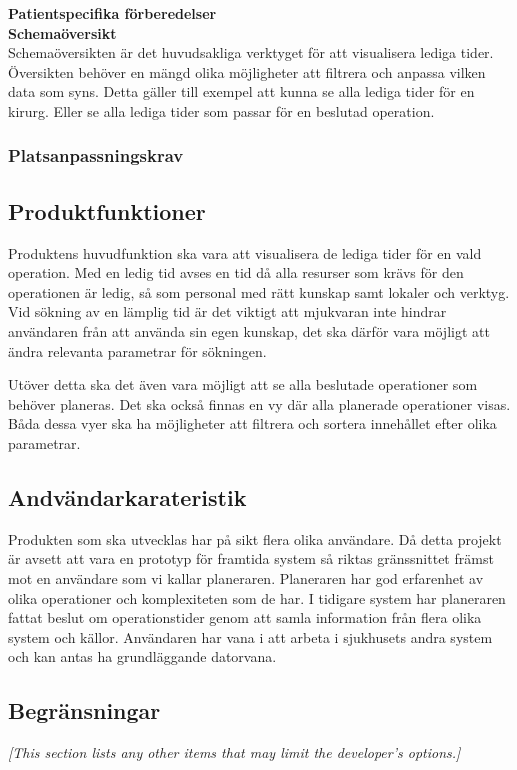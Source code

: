 \documentclass{article}
\begin{document}
\begin{enumerate}
\textbf{Patientspecifika förberedelser}\\
\textbf{Schemaöversikt}\\
Schemaöversikten är det huvudsakliga verktyget för att visualisera lediga tider.
Översikten behöver en mängd olika möjligheter att filtrera och anpassa vilken
data som syns. Detta gäller till exempel att kunna se alla lediga tider för en
kirurg. Eller se alla lediga tider som passar för en beslutad operation.\\


\subsubsection{Platsanpassningskrav}
\label{subsec:Platsanpassningskrav}
\subsection{Produktfunktioner}
\label{subsec:Produktfunktioner}
Produktens huvudfunktion ska vara att visualisera de lediga tider för en vald
operation. Med en ledig tid avses en tid då alla resurser som krävs för den
operationen är ledig, så som personal med rätt kunskap samt lokaler och verktyg.
Vid sökning av en lämplig tid är det viktigt att mjukvaran inte hindrar
användaren från att använda sin egen kunskap, det ska därför vara möjligt att
ändra relevanta parametrar för sökningen.

Utöver detta ska det även vara möjligt att se alla beslutade operationer som
behöver planeras. Det ska också finnas en vy där alla planerade operationer
visas. Båda dessa vyer ska ha möjligheter att filtrera och sortera innehållet
efter olika parametrar.
\subsection{Andvändarkarateristik}
\label{subsec:Andvandarkarateristik}
Produkten som ska utvecklas har på sikt flera olika användare. Då detta
projekt är avsett att vara en prototyp för framtida system så riktas gränssnittet
främst mot en användare som vi kallar planeraren. Planeraren har god
erfarenhet av olika operationer och komplexiteten som de har. I tidigare system
har planeraren fattat beslut om operationstider genom att samla information
från flera olika system och källor. Användaren har vana i att arbeta i sjukhusets
andra system och kan antas ha grundläggande datorvana.

\subsection{Begränsningar}
\label{subsec:Begransningar}
\emph{[This section lists any other items that may limit the developer's
  options.]}



\end{enumerate}
\end{document}
